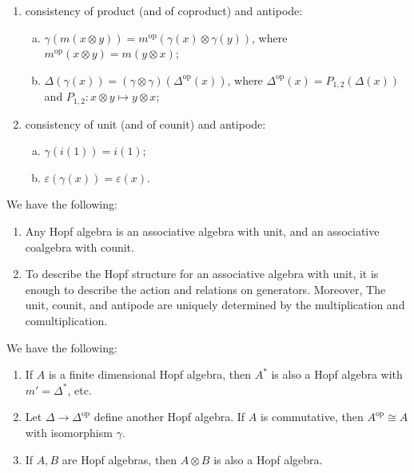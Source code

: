 \begin{definition}
\begin{enumerate}
\begin{enumerate}[(a)]
        \item $\Delta(i(1)) = i(1) \otimes i(1))$;
      \end{enumerate}
    \item consistency of product
      (and of coproduct) and antipode:
      \begin{enumerate}[(a)]
        \item $\gamma(m(x \otimes y)) = m^\mathrm{op}(\gamma(x) \otimes \gamma(y))$,
          where $m^\mathrm{op}(x \otimes y) = m(y \otimes x)$;
        \item $\Delta(\gamma(x)) = (\gamma \otimes \gamma)(\Delta^\mathrm{op}(x))$, where $\Delta^\mathrm{op}(x) = P_{1, 2}(\Delta(x))$
          and $P_{1, 2} : x \otimes y \mapsto y \otimes x$;
      \end{enumerate}
    \item consistency of unit (and of counit)
      and antipode:
      \begin{enumerate}[(a)]
        \item $\gamma(i(1)) = i(1)$;
        \item $\varepsilon(\gamma(x)) = \varepsilon(x)$.
      \end{enumerate}
  \end{enumerate}
\end{definition}

\begin{remark}
  We have the following:
  \begin{enumerate}
    \item Any Hopf algebra is an
      associative algebra with unit, and
      an associative coalgebra with counit.
    \item To describe the Hopf structure for
      an associative algebra with unit, it is
      enough to describe the action and relations
      on generators. Moreover,
      The unit, counit, and antipode
      are uniquely determined by the
      multiplication and comultiplication.
  \end{enumerate}
\end{remark}

\begin{corollary}
  We have the following:
  \begin{enumerate}
    \item If $A$ is a finite dimensional
      Hopf algebra, then $A^*$ is also a
      Hopf algebra with $m' = \Delta^*$, etc.
    \item Let $\Delta \to \Delta^{\mathrm{op}}$
      define another Hopf algebra. If
      $A$ is commutative, then $A^{\mathrm{op}} \cong A$
      with isomorphism $\gamma$.
    \item If $A, B$ are Hopf algebras,
      then $A \otimes B$ is also a Hopf algebra.
  \end{enumerate}
\end{corollary}

